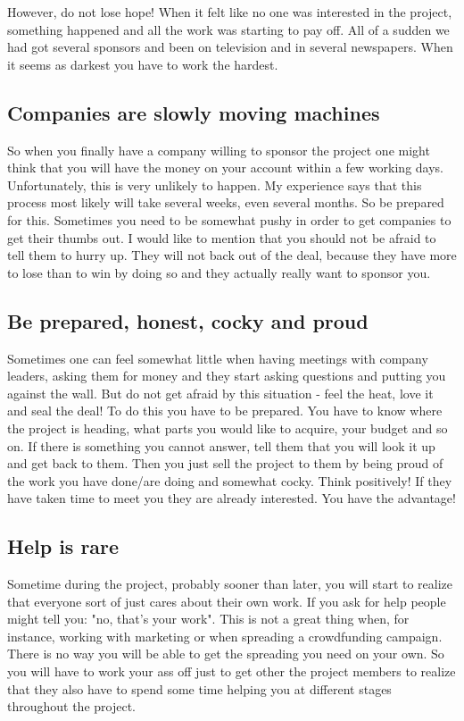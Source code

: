 However, do not lose hope! When it felt like no one was interested in the project, something happened and all the work was starting to pay off. All of a sudden we had got several sponsors and been on television and in several newspapers. When it seems as darkest you have to work the hardest.

\subsection{Companies are slowly moving machines}
So when you finally have a company willing to sponsor the project one might think that you will have the money on your account within a few working days. Unfortunately, this is very unlikely to happen. My experience says that this process most likely will take several weeks, even several months. So be prepared for this. Sometimes you need to be somewhat pushy in order to get companies to get their thumbs out. I would like to mention that you should not be afraid to tell them to hurry up. They will not back out of the deal, because they have more to lose than to win by doing so and they actually really want to sponsor you.

\subsection{Be prepared, honest, cocky and proud}
Sometimes one can feel somewhat little when having meetings with company leaders, asking them for money and they start asking questions and putting you against the wall. But do not get afraid by this situation - feel the heat, love it and seal the deal! To do this you have to be prepared. You have to know where the project is heading, what parts you would like to acquire, your budget and so on. If there is something you cannot answer, tell them that you will look it up and get back to them. Then you just sell the project to them by being proud of the work you have done/are doing and somewhat cocky.  Think positively! If they have taken time to meet you they are already interested. You have the advantage!

\subsection{Help is rare}
Sometime during the project, probably sooner than later, you will start to realize that everyone sort of just cares about their own work. If you ask for help people might tell you: "no, that's your work". This is not a great thing when, for instance,  working with marketing or when spreading a crowdfunding campaign. There is no way you will be able to get the spreading you need on your own. So you will have to work your ass off just to get other the project members to realize that they also have to spend some time helping you at different stages throughout the project. 

